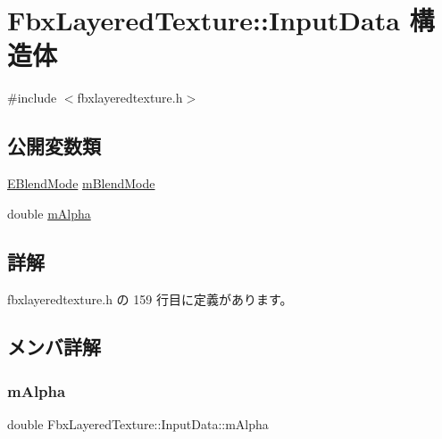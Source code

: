 \hypertarget{struct_fbx_layered_texture_1_1_input_data}{}\section{Fbx\+Layered\+Texture\+:\+:Input\+Data 構造体}
\label{struct_fbx_layered_texture_1_1_input_data}


{\ttfamily \#include $<$fbxlayeredtexture.\+h$>$}

\subsection*{公開変数類}
\begin{DoxyCompactItemize}
\item 
\hyperlink{class_fbx_layered_texture_af291d42b0329513909d2ddf48f56f5ba}{E\+Blend\+Mode} \hyperlink{struct_fbx_layered_texture_1_1_input_data_abc788f95c5595020e3d8989ee3d02a2b}{m\+Blend\+Mode}
\item 
double \hyperlink{struct_fbx_layered_texture_1_1_input_data_a537e5070bf114a808f72fe15a2baab66}{m\+Alpha}
\end{DoxyCompactItemize}


\subsection{詳解}


 fbxlayeredtexture.\+h の 159 行目に定義があります。



\subsection{メンバ詳解}
\mbox{\label{struct_fbx_layered_texture_1_1_input_data_a537e5070bf114a808f72fe15a2baab66}} 
\subsubsection{\texorpdfstring{m\+Alpha}{mAlpha}}
{\footnotesize\ttfamily double Fbx\+Layered\+Texture\+::\+Input\+Data\+::m\+Alpha}



